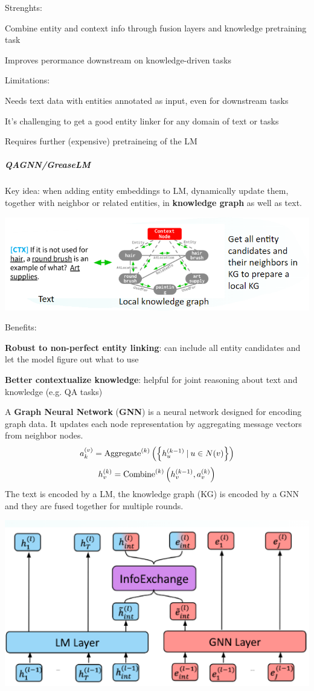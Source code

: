 \documentclass[10pt]{report}
\begin{document}
Strenghts:
\begin{list}{}{}
	\item Combine entity and context info through fusion layers and knowledge pretraining task
	\item Improves perormance downstream on knowledge-driven tasks
\end{list}
Limitations:
\begin{list}{}{}
	\item Needs text data with entities annotated as input, even for downstream tasks
	\item It's challenging to get a good entity linker for any domain of text or tasks
	\item Requires further (expensive) pretraineing of the LM
\end{list}
\subparagraph{QAGNN/GreaseLM} Key idea: when adding entity embeddings to LM, dynamically update them, together with neighbor or related entities, in \textbf{knowledge graph} as well as text.
\begin{center}
	\includegraphics[scale=0.5]{129.png}
\end{center}
Benefits:
\begin{list}{}{}
	\item \textbf{Robust to non-perfect entity linking}: can include all entity  candidates and let the model figure out what to use
	\item \textbf{Better contextualize knowledge}: helpful for joint reasoning about text and knowledge (e.g. QA tasks)
\end{list}
A \textbf{Graph Neural Network} (\textbf{GNN}) is a neural network designed for encoding graph data. It updates each node representation by aggregating message vectors from neighbor nodes.
$$a_k^{(v)} = \hbox{Aggregate}^{(k)}\left(\left\{h_u^{(k-1)}\:|\:u\in N(v)\right\}\right)$$
$$h_v^{(k)} = \hbox{Combine}^{(k)}\left(h_v^{(k-1)},a_v^{(k)}\right)$$
The text is encoded by a LM, the knowledge graph (KG) is encoded by a GNN and they are fused together for multiple rounds.
\begin{center}
	\includegraphics[scale=0.5]{130.png}
\end{center}
\end{document}
